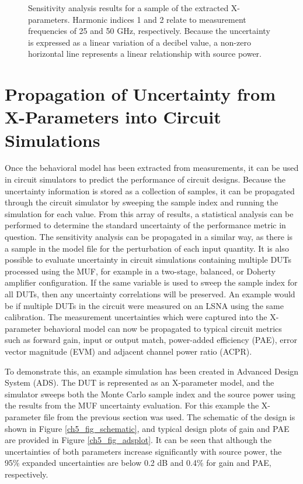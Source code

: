 \documentclass[../thesis/thesis.tex]{subfiles}
\begin{document}
\begin{refsection}
\begin{figure}
\begin{subfigure}{0.45\textwidth}
		\label{ch5_fig_t2121phasesens}
	\end{subfigure}
	\caption{Sensitivity analysis results for a sample of the extracted X-parameters. Harmonic indices 1 and 2 relate to measurement frequencies of 25 and 50 GHz, respectively. Because the uncertainty is expressed as a linear variation of a decibel value, a non-zero horizontal line represents a linear relationship with source power.}
	\label{ch5_fig_sensplots}
\end{figure}

\section{Propagation of Uncertainty from X-Parameters into Circuit Simulations}

Once the behavioral model has been extracted from measurements, it can be used in circuit simulators to predict the performance of circuit designs. Because the uncertainty information is stored as a collection of samples, it can be propagated through the circuit simulator by sweeping the sample index and running the simulation for each value. From this array of results, a statistical analysis can be performed to determine the standard uncertainty of the performance metric in question. The sensitivity analysis can be propagated in a similar way, as there is a sample in the model file for the perturbation of each input quantity. It is also possible to evaluate uncertainty in circuit simulations containing multiple DUTs processed using the MUF, for example in a two-stage, balanced, or Doherty amplifier configuration. If the same variable is used to sweep the sample index for all DUTs, then any uncertainty correlations will be preserved. An example would be if multiple DUTs in the circuit were measured on an LSNA using the same calibration.
The measurement uncertainties which were captured into the X-parameter behavioral model can now be propagated to typical circuit metrics such as forward gain, input or output match, power-added efficiency (PAE), error vector magnitude (EVM) and adjacent channel power ratio (ACPR).

To demonstrate this, an example simulation has been created in Advanced Design System (ADS). The DUT is represented as an X-parameter model, and the simulator sweeps both the Monte Carlo sample index and the source power using the results from the MUF uncertainty evaluation. For this example the X-parameter file from the previous section was used. The schematic of the design is shown in Figure \ref{ch5_fig_schematic}, and typical design plots of gain and PAE are provided in Figure \ref{ch5_fig_adsplot}. It can be seen that although the uncertainties of both parameters increase significantly with source power, the 95\% expanded uncertainties are below 0.2 dB and 0.4\% for gain and PAE, respectively.


\end{refsection}
\end{document}
